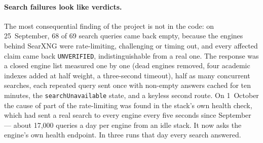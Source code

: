 \paragraph{Search failures look like verdicts.} The most consequential
finding of the project is not in the code: on 25~September, 68 of 69
search queries came back empty, because the engines behind SearXNG were
rate-limiting, challenging or timing out, and every affected claim came
back \texttt{UNVERIFIED}, indistinguishable from a real one. The
response was a closed engine list measured one by one (dead engines
removed, four academic indexes added at half weight, a three-second
timeout), half as many concurrent searches, each repeated query sent
once with non-empty answers cached for ten minutes, the
\texttt{searchUnavailable} state, and a keyless second route. On
1~October the cause of part of the rate-limiting was found in the
stack's own health check, which had sent a real search to every engine
every five seconds since September --- about 17,000 queries a day per
engine from an idle stack. It now asks the engine's own health
endpoint. In three runs that day every search answered.
